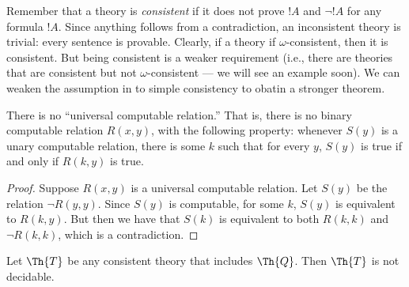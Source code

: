 \documentclass[../../include/open-logic-section]{subfiles}
\begin{document}


\begin{explain}
Remember that a theory is {\em consistent} if it does not prove $!A$
and $\lnot !A$ for any formula $!A$. Since anything follows from a
contradiction, an inconsistent theory is trivial: every sentence is
provable. Clearly, if a theory if $\omega$-consistent, then it is
consistent. But being consistent is a weaker requirement (i.e., there
are theories that are consistent but not $\omega$-consistent --- we
will see an example soon). We can weaken the assumption in
 to simple consistency to obatin a stronger
theorem.
\end{explain}

\begin{lem}
There is no ``universal computable relation.'' That is, there is no
binary computable relation $R(x,y)$, with the following property:
whenever $S(y)$ is a unary computable relation, there is some $k$ such
that for every $y$, $S(y)$ is true if and only if $R(k,y)$ is true.
\end{lem}

\begin{proof}
Suppose $R(x,y)$ is a universal computable relation. Let $S(y)$
be the relation $\lnot R(y,y)$. Since $S(y)$ is computable, for some
$k$, $S(y)$ is equivalent to $R(k,y)$. But then we have that $S(k)$ is
equivalent to both $R(k,k)$ and $\lnot R(k,k)$, which is a
contradiction. 
\end{proof}


\begin{thm}
Let $\Th{T}$ be any consistent theory that includes $\Th{Q}$. Then
$\Th{T}$ is not decidable.
\end{thm}
\end{document}
